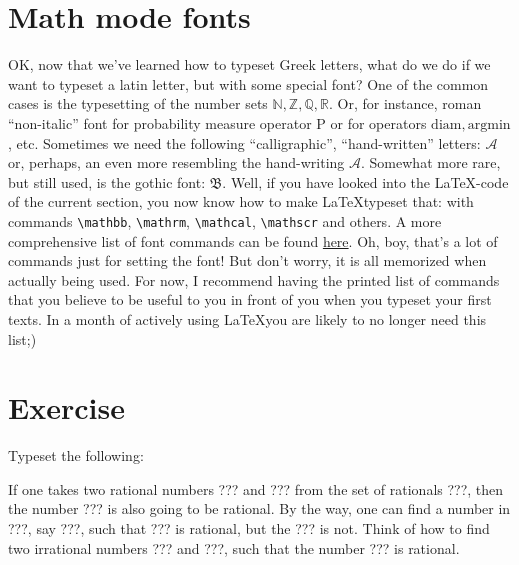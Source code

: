 \section{Math mode fonts}
\par OK, now that we’ve learned how to typeset Greek letters, what do we do if we want to typeset a latin letter, but with some special font? One of the common cases is the typesetting of the number sets \(\mathbb{N}, \mathbb{Z}, \mathbb{Q}, \mathbb{R}\). Or, for instance, roman “non-italic” font for probability measure operator \(\mathrm{P}\) or for operators \(\mathrm{diam}, \mathrm{argmin}\), etc. Sometimes we need the following “calligraphic”, “hand-written” letters: \(\mathcal{A}\) or, perhaps, an even more resembling the hand-writing \(\mathscr{A}\). Somewhat more rare, but still used, is the gothic font: \( \mathfrak{B} \). Well, if you have looked into the \LaTeX-code of the current section, you now know how to make \LaTeX typeset that: with commands \verb"\mathbb", \verb"\mathrm", \verb"\mathcal", \verb"\mathscr" and others. A more comprehensive list of font commands can be found \href{https://tex.stackexchange.com/a/58124}{here}. Oh, boy, that’s a lot of commands just for setting the font! But don’t worry, it is all memorized when actually being used. For now, I recommend having the printed list of commands that you believe to be useful to you in front of you when you typeset your first texts. In a month of actively using \LaTeX you are likely to no longer need this list;)

\section{Exercise}
\begin{staticpart}
Typeset the following:
\end{staticpart}
\par If one takes two rational numbers ??? and ??? from the set of rationals ???, then the number ??? is also going to be rational. By the way, one can find a number in ???, say ???, such that ??? is rational, but the ??? is not. Think of how to find two irrational numbers ??? and ???, such that the number ??? is rational.

